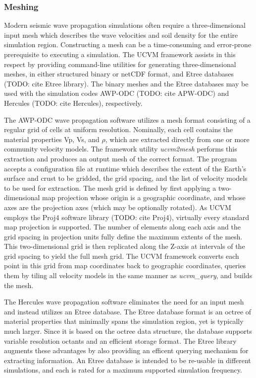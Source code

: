 \subsubsection{Meshing}
Modern seismic wave propagation simulations often require a three-dimensional input mesh which describes the wave velocities and soil density for the entire simulation region. Constructing a mesh can be a time-consuming and error-prone prerequisite to executing a simulation. The UCVM framework assists in this respect by providing command-line utilities for generating three-dimensional meshes, in either structured binary or netCDF format, and Etree databases (TODO: cite Etree library). The binary meshes and the Etree databases may be used with the simulation codes AWP-ODC (TODO: cite APW-ODC) and Hercules (TODO: cite Hercules), respectively.

The AWP-ODC wave propagation software utilizes a mesh format consisting of a regular grid of cells at uniform resolution. Nominally, each cell contains the material properties Vp, Vs, and $\rho$, which are extracted directly from one or more community velocity models. The framework utility \emph{ucvm2mesh} performs this extraction and produces an output mesh of the correct format. The program accepts a configuration file at runtime which describes the extent of the Earth's surface and crust to be gridded, the grid spacing, and the list of velocity models to be used for extraction. The mesh grid is defined by first applying a two-dimensional map projection whose origin is a geographic coordinate, and whose axes are the projection axes (which may be optionally rotated). As UCVM employs the Proj4 software library (TODO: cite Proj4), virtually every standard map projection is supported. The number of elements along each axis and the grid spacing in projection units fully define the maximum extents of the mesh. This two-dimensional grid is then replicated along the Z-axis at intervals of the grid spacing to yield the full mesh grid. The UCVM framework converts each point in this grid from map coordinates back to geographic coordinates, queries them by tiling all velocity models in the same manner as \emph{ucvm\_query}, and builds the mesh.

The Hercules wave propagation software eliminates the need for an input mesh and instead utilizes an Etree database. The Etree database format is an octree of material properties that minimally spans the simulation region, yet is typically much larger. Since it is based on the octree data structure, the database supports variable resolution octants and an efficient storage format. The Etree library augments these advantages by also providing an efficent querying mechanism for extracting information. An Etree database is intended to be re-usable in different simulations, and each is rated for a maximum supported simulation frequency. 

